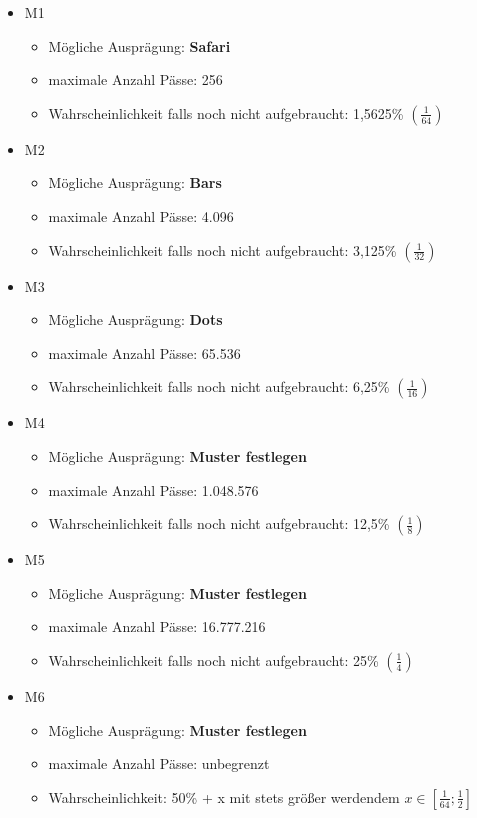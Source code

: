\begin{NFT-Prop}
\begin{itemize}
    \item M1
    \begin{itemize}
    	\item Mögliche Ausprägung: \textbf{Safari} 
    	\item maximale Anzahl Pässe: 256
    	\item Wahrscheinlichkeit falls noch nicht aufgebraucht: 1,5625\% $\left( \frac{1}{64} \right)$
    \end{itemize}
    \item M2
    \begin{itemize}
    	\item Mögliche Ausprägung: \textbf{Bars} 
    	\item maximale Anzahl Pässe: 4.096
    	\item Wahrscheinlichkeit falls noch nicht aufgebraucht: 3,125\% $\left( \frac{1}{32} \right)$
    \end{itemize}
    \item M3
    \begin{itemize}
    	\item Mögliche Ausprägung: \textbf{Dots} 
    	\item maximale Anzahl Pässe: 65.536
    	\item Wahrscheinlichkeit falls noch nicht aufgebraucht: 6,25\% $\left( \frac{1}{16} \right)$
    \end{itemize}
    \item M4
    \begin{itemize}
    	\item Mögliche Ausprägung: \textbf{Muster festlegen} 
    	\item maximale Anzahl Pässe: 1.048.576
    	\item Wahrscheinlichkeit falls noch nicht aufgebraucht: 12,5\% $\left( \frac{1}{8} \right)$
    \end{itemize}
    \item M5
    \begin{itemize}
    	\item Mögliche Ausprägung: \textbf{Muster festlegen}  
    	\item maximale Anzahl Pässe: 16.777.216
    	\item Wahrscheinlichkeit falls noch nicht aufgebraucht: 25\% $\left( \frac{1}{4} \right)$
    \end{itemize}
    \item M6
    \begin{itemize}
    	\item Mögliche Ausprägung: \textbf{Muster festlegen}
    	\item maximale Anzahl Pässe: unbegrenzt  
    	\item Wahrscheinlichkeit: 50\% + x mit stets größer werdendem $x \in \left[ \frac{1}{64}; \frac{1}{2} \right]$
    \end{itemize}
\end{itemize}


\end{NFT-Prop}
